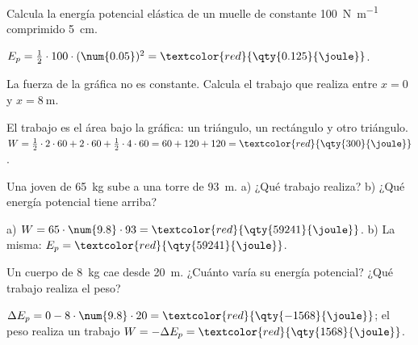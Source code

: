 \begin{exercise}
    Calcula la energía potencial elástica de un muelle de constante \qty{100}{\newton\per\m} comprimido \qty{5}{\cm}.
    \begin{solu}
        \(E_p = \frac{1}{2} \cdot 100 \cdot (\num{0.05})^2 = \textcolor{red}{\qty{0.125}{\joule}}\).
    \end{solu}
\end{exercise}

\begin{exercise}
    La fuerza de la gráfica no es constante. Calcula el trabajo que realiza entre \(x = 0\) y \(x = \qty{8}{\m}\).
    \begin{center}
    \end{center}
    \begin{solu}
        El trabajo es el área bajo la gráfica: un triángulo, un rectángulo y otro triángulo.
        \(W = \frac{1}{2} \cdot 2 \cdot 60 + 2 \cdot 60 + \frac{1}{2} \cdot 4 \cdot 60 = 60 + 120 + 120 = \textcolor{red}{\qty{300}{\joule}}\).
    \end{solu}
\end{exercise}

\begin{exercise}
    Una joven de \qty{65}{\kg} sube a una torre de \qty{93}{\m}. a) ¿Qué trabajo realiza? b) ¿Qué energía potencial tiene arriba?
    \begin{solu}
        a) \(W = 65 \cdot \num{9.8} \cdot 93 = \textcolor{red}{\qty{59241}{\joule}}\). b) La misma: \(E_p = \textcolor{red}{\qty{59241}{\joule}}\).
    \end{solu}
\end{exercise}

\begin{exercise}
    Un cuerpo de \qty{8}{\kg} cae desde \qty{20}{\m}. ¿Cuánto varía su energía potencial? ¿Qué trabajo realiza el peso?
    \begin{solu}
        \(\Delta E_p = 0 - 8 \cdot \num{9.8} \cdot 20 = \textcolor{red}{\qty{-1568}{\joule}}\); el peso realiza un trabajo \(W = -\Delta E_p = \textcolor{red}{\qty{1568}{\joule}}\).
    \end{solu}
\end{exercise}

